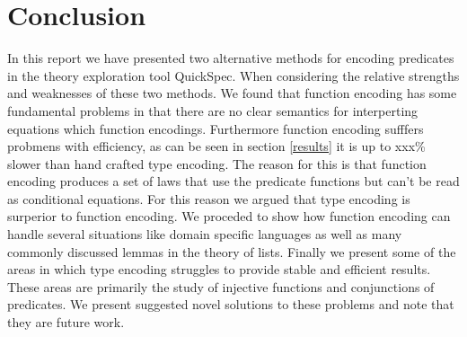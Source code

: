 \section{Conclusion}
In this report we have presented two 
alternative methods for encoding predicates
in the theory exploration tool QuickSpec.
When considering the relative strengths and weaknesses
of these two methods. We found that function encoding has
some fundamental problems in that there are no clear
semantics for interperting equations which function encodings.
Furthermore function encoding sufffers probmens with efficiency,
as can be seen in section \ref{results} it is up to xxx\% slower
than hand crafted type encoding. The reason for this is that 
function encoding produces a set of laws that use the predicate
functions but can't be read as conditional equations.
For this reason we argued that type encoding is surperior
to function encoding. We proceded to show how function encoding
can handle several situations like domain specific languages
as well as many commonly discussed lemmas in the theory
of lists. Finally we present some of the areas in which
type encoding struggles to provide stable and efficient results.
These areas are primarily the study of injective functions
and conjunctions of predicates. We present suggested novel
solutions to these problems and note that they are future work.
